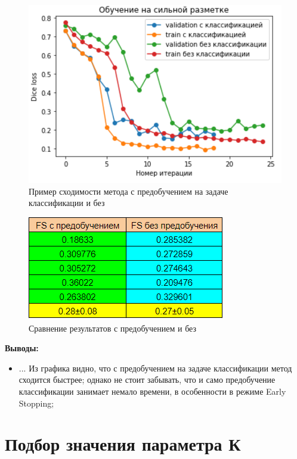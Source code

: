 \begin{figure}[h!] 
  \center
  \includegraphics [scale=0.8] {images/cmp_class_no_class.png}
  \caption{ Пример сходимости метода с предобучением на задаче классификации и без} \label{fig:cmp_class_no_class}
\end{figure}

\begin{figure}[ht] 
  \center
  \includegraphics [scale=1.0] {images/cmp_pretrain.png}
  \caption{ Сравнение результатов с предобучением и без} 
  \label{fig:cmp_pretrain}  
\end{figure}

{\bf Выводы:}

\begin{itemize}
    \item ...
    \itemize Из графика видно, что с предобучением на задаче классификации метод сходится быстрее; однако не стоит забывать, что и само предобучение классификации занимает немало времени, в особенности в режиме Early Stopping;
\end{itemize}
\newpage
\section{Подбор значения параметра К}


